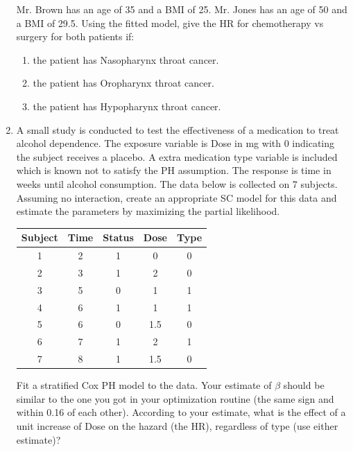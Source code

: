\documentclass[12pt]{article}
\begin{document}
\begin{enumerate}[1.]
\begin{center}
\end{center}
Mr. Brown has an age of 35 and a BMI of 25. Mr. Jones has an age of 50 and a BMI of 29.5. Using the fitted model, give the HR for chemotherapy vs surgery for both patients if:
\begin{enumerate}
\item  the patient has Nasopharynx throat cancer.
\item  the patient has Oropharynx throat cancer.
\item  the patient has Hypopharynx throat cancer.
\end{enumerate}
\item A small study is conducted to test the effectiveness of a medication to treat alcohol dependence. The exposure variable is Dose in mg with 0 indicating the subject receives a placebo.  A extra medication type variable is included which is known not to satisfy the PH assumption.  The response is time in weeks until alcohol consumption. The data below is collected on 7 subjects. Assuming no interaction, create an appropriate SC model for this data and estimate the parameters by maximizing the partial likelihood.
\begin{center}
\begin{tabular}{ c c c c c} \hline
Subject & Time & Status & Dose & Type \\ \hline
1 & 2 & 1 &  0 & 0\\
 2 & 3 & 1 &  2 & 0\\
3 & 5 & 0  & 1 & 1\\
4  & 6 & 1  & 1 & 1\\
5  & 6 & 0  & 1.5 & 0 \\
6  & 7 & 1  & 2 & 1 \\
7  & 8 & 1  & 1.5 & 0 \\
\end{tabular}
\end{center}
Fit a stratified Cox PH model to the data. Your estimate of $\beta$ should be similar to the one you got in your optimization routine (the same sign and within 0.16 of each other). 
According to your estimate, what is the effect of a unit increase of Dose on the hazard (the HR), regardless of type (use either estimate)? 
\end{enumerate} 
\end{document}
